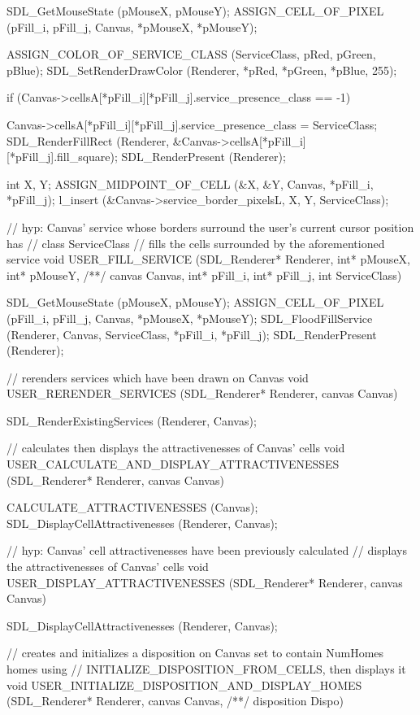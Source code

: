 \begin{C}
{	SDL_GetMouseState (pMouseX, pMouseY);
	ASSIGN_CELL_OF_PIXEL (pFill_i, pFill_j, Canvas, *pMouseX, *pMouseY);
	
	ASSIGN_COLOR_OF_SERVICE_CLASS (ServiceClass, pRed, pGreen, pBlue);
	SDL_SetRenderDrawColor (Renderer, *pRed, *pGreen, *pBlue, 255);
	
	if (Canvas->cellsA[*pFill_i][*pFill_j].service_presence_class == -1){
		
		Canvas->cellsA[*pFill_i][*pFill_j].service_presence_class = ServiceClass;
		SDL_RenderFillRect (Renderer, &Canvas->cellsA[*pFill_i][*pFill_j].fill_square);
		SDL_RenderPresent (Renderer);
		
		int X, Y;
		ASSIGN_MIDPOINT_OF_CELL (&X, &Y, Canvas, *pFill_i, *pFill_j);
		l_insert (&Canvas->service_border_pixelsL, X, Y, ServiceClass);
	}
}


// hyp: Canvas' service whose borders surround the user's current cursor position has
// class ServiceClass
// fills the cells surrounded by the aforementioned service
void USER_FILL_SERVICE (SDL_Renderer* Renderer, int* pMouseX, int* pMouseY,
/**/ canvas Canvas, int* pFill_i, int* pFill_j, int ServiceClass){
	
	SDL_GetMouseState (pMouseX, pMouseY);
	ASSIGN_CELL_OF_PIXEL (pFill_i, pFill_j, Canvas, *pMouseX, *pMouseY);
	SDL_FloodFillService (Renderer, Canvas, ServiceClass, *pFill_i, *pFill_j);
	SDL_RenderPresent (Renderer);
}


// rerenders services which have been drawn on Canvas
void USER_RERENDER_SERVICES (SDL_Renderer* Renderer, canvas Canvas){
	
	SDL_RenderExistingServices (Renderer, Canvas);
}

// calculates then displays the attractivenesses of Canvas' cells
void USER_CALCULATE_AND_DISPLAY_ATTRACTIVENESSES (SDL_Renderer* Renderer, canvas Canvas){
	
	CALCULATE_ATTRACTIVENESSES (Canvas);
	SDL_DisplayCellAttractivenesses (Renderer, Canvas);
}


// hyp: Canvas' cell attractivenesses have been previously calculated
// displays the attractivenesses of Canvas' cells
void USER_DISPLAY_ATTRACTIVENESSES (SDL_Renderer* Renderer, canvas Canvas){
	
	SDL_DisplayCellAttractivenesses (Renderer, Canvas);
}


// creates and initializes a disposition on Canvas set to contain NumHomes homes using
// INITIALIZE_DISPOSITION_FROM_CELLS, then displays it
void USER_INITIALIZE_DISPOSITION_AND_DISPLAY_HOMES (SDL_Renderer* Renderer, canvas Canvas,
/**/ disposition Dispo){
	
}
\end{C}
